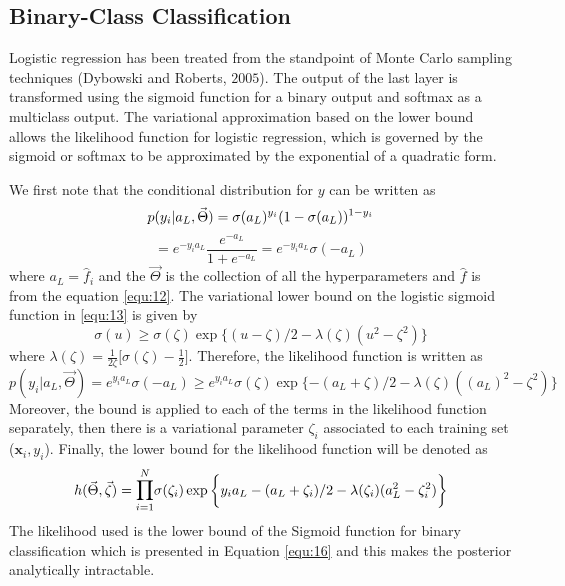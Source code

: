 \documentclass[]{article}
\begin{document}
\subsection*{Binary-Class Classification}
Logistic regression has been treated from the standpoint of Monte Carlo sampling techniques (Dybowski and Roberts, $2005$). The output of the last layer is transformed using the sigmoid function for a binary output and softmax as a multiclass output. The variational approximation based on the lower bound allows the likelihood function for logistic regression, which is governed by the sigmoid or softmax to be approximated by the exponential of a quadratic form. \par We first note that the conditional distribution for $y$ can be written as 
\begin{equation}
	p(y_i|a_L,\vec{\Theta}) = \sigma(a_L)^{y_i} (1-\sigma(a_L))^{1-y_i}
	\notag
\end{equation}
\begin{equation}
	= e^{-y_ia_L} \frac{e^{-a_L}}{1 + e^{-a_L}} = e^{-y_ia_L} \sigma(-a_L)
	\label{equ:13}
\end{equation}
where $a_L = \hat{f}_i$ and the $\vec{\Theta}$ is the collection of all the hyperparameters and $\hat{f}$ is from the equation \ref{equ:12}. The variational lower bound on the logistic sigmoid function in \ref{equ:13} is given by 
\begin{equation}
	\sigma(u) \geq \sigma(\zeta) \exp \{(u-\zeta) / 2 - \lambda(\zeta) (u^2 - \zeta^2)\}
	\label{equ:14}
\end{equation}
where $\lambda(\zeta) = \frac{1}{2\zeta}\bigg[\sigma(\zeta) - \frac{1}{2}\bigg]$. Therefore, the likelihood function is written as 
\begin{equation}
	p(y_i|a_L, \vec{\Theta}) = e^{y_ia_L}\sigma(-a_L) \geq e^{y_ia_L} \sigma(\zeta) \exp \{-(a_L+\zeta) / 2 - \lambda(\zeta) ((a_L)^2 - \zeta^2)\}
	\label{equ:15}
\end{equation} 
Moreover, the bound is applied to each of the terms in the likelihood function separately, then there is a variational parameter $\zeta_i$ associated to each training set ($\mathbf{x}_i, y_i$). Finally, the lower bound for the likelihood function will be denoted as 
\begin{equation}
	h(\vec{\Theta}, \vec{\zeta}) = \mathlarger \prod_{i=1}^{N} \sigma(\zeta_i) \exp\bigg\{y_ia_L - (a_L + \zeta_i) / 2 - \lambda(\zeta_i)(a_L^2 - \zeta_i^2)\bigg\}
	\label{equ:16}
\end{equation}
The likelihood used is the lower bound of the Sigmoid function for binary classification which is presented in Equation \ref{equ:16} and this makes the posterior analytically intractable. 
\end{document}
